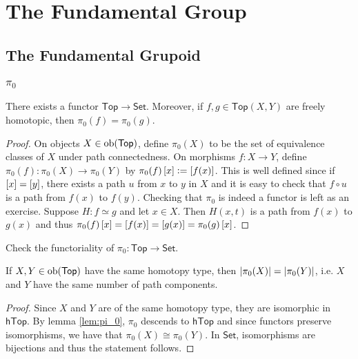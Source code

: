 \chapter{The Fundamental Group}



\section*{The Fundamental Grupoid}
\subsection*{$\pi_0$}

\begin{lemma}
	There exists a functor $\mathsf{Top} \to \mathsf{Set}$. Moreover, if $f,g \in \mathsf{Top}(X,Y)$ are freely homotopic, then $\pi_0(f) = \pi_0(g)$.
	\label{lem:pi_0}
\end{lemma}

\begin{proof}
	On objects $X \in \operatorname{ob}(\mathsf{Top})$, define $\pi_0(X)$ to be the set of equivalence classes of $X$ under path connectedness. On morphisms $f : X \to Y$, define $\pi_0(f) : \pi_0(X) \to \pi_0(Y)$ by $\pi_0(f)\sbr{x} := \sbr[0]{f(x)}$. This is well defined since if $\sbr{x} = \sbr[0]{y}$, there exists a path $u$ from $x$ to $y$ in $X$ and it is easy to check that $f \circ u$ is a path from $f(x)$ to $f(y)$. Checking that $\pi_0$ is indeed a functor is left as an exercise. Suppose $H : f \simeq g$ and let $x \in X$. Then $H(x,t)$ is a path from $f(x)$ to $g(x)$ and thus $\pi_0(f)\sbr{x} = \sbr[0]{f(x)} = \sbr[0]{g(x)} = \pi_0(g)\sbr{x}$.
\end{proof}

\begin{exercise}
	Check the functoriality of $\pi_0 : \mathsf{Top} \to \mathsf{Set}$.
\end{exercise}

\begin{proposition}
	If $X,Y \in \operatorname{ob}(\mathsf{Top})$ have the same homotopy type, then $\abs[0]{\pi_0(X)} = \abs[0]{\pi_0(Y)}$, i.e. $X$ and $Y$ have the same number of path components.
\end{proposition}

\begin{proof}
	Since $X$ and $Y$ are of the same homotopy type, they are isomorphic in $\mathsf{hTop}$. By lemma \ref{lem:pi_0}, $\pi_0$ descends to $\mathsf{hTop}$ and since functors preserve isomorphisms, we have that $\pi_0(X) \cong \pi_0(Y)$. In $\mathsf{Set}$, isomorphisms are bijections and thus the statement follows.
\end{proof}

